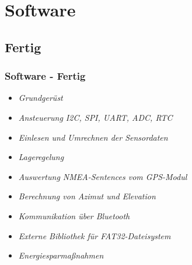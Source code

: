 \documentclass{beamer}
\begin{document}

\section{Software}
\subsection{Fertig}
\begin{frame}
  \frametitle{Software - Fertig}
  \begin{itemize}
  \item \emph{Grundgerüst}
  \item \emph{Ansteuerung I2C, SPI, UART, ADC, RTC}
  \item \emph{Einlesen und Umrechnen der Sensordaten}
  \item \emph{Lageregelung}
  \item \emph{Auswertung NMEA-Sentences vom GPS-Modul}
  \item \emph{Berechnung von Azimut und Elevation}
  \item \emph{Kommunikation über Bluetooth}
  \item \emph{Externe Bibliothek für FAT32-Dateisystem}
  \item \emph{Energiesparmaßnahmen}
  \end{itemize}
\end{frame}
\end{document}

